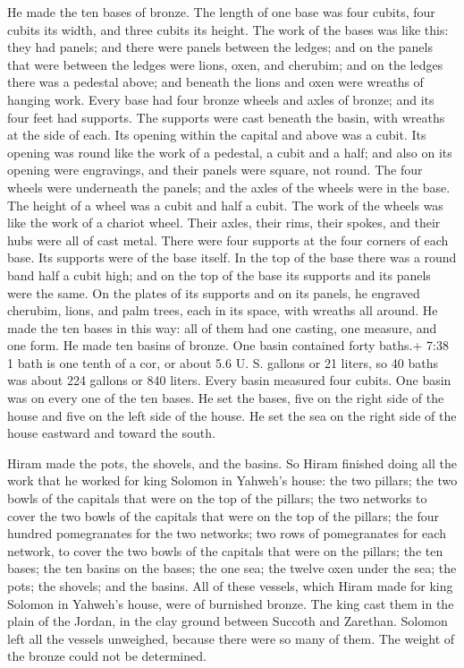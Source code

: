  He made the ten bases of bronze. The length of one base
was four cubits, four cubits its width, and three cubits its height.
 The work of the bases was like this: they had panels; and
there were panels between the ledges;  and on the panels
that were between the ledges were lions, oxen, and cherubim; and on the
ledges there was a pedestal above; and beneath the lions and oxen were
wreaths of hanging work.  Every base had four bronze wheels
and axles of bronze; and its four feet had supports. The supports were
cast beneath the basin, with wreaths at the side of each. 
Its opening within the capital and above was a cubit. Its opening was
round like the work of a pedestal, a cubit and a half; and also on its
opening were engravings, and their panels were square, not round.
 The four wheels were underneath the panels; and the axles
of the wheels were in the base. The height of a wheel was a cubit and
half a cubit.  The work of the wheels was like the work of
a chariot wheel. Their axles, their rims, their spokes, and their hubs
were all of cast metal.  There were four supports at the
four corners of each base. Its supports were of the base itself.
 In the top of the base there was a round band half a cubit
high; and on the top of the base its supports and its panels were the
same.  On the plates of its supports and on its panels, he
engraved cherubim, lions, and palm trees, each in its space, with
wreaths all around.  He made the ten bases in this way: all
of them had one casting, one measure, and one form.  He
made ten basins of bronze. One basin contained forty baths.+ 7:38 1 bath
is one tenth of a cor, or about 5.6 U. S. gallons or 21 liters, so 40
baths was about 224 gallons or 840 liters. Every basin measured four
cubits. One basin was on every one of the ten bases.  He
set the bases, five on the right side of the house and five on the left
side of the house. He set the sea on the right side of the house
eastward and toward the south.

 Hiram made the pots, the shovels, and the basins. So Hiram
finished doing all the work that he worked for king Solomon in Yahweh's
house:  the two pillars; the two bowls of the capitals that
were on the top of the pillars; the two networks to cover the two bowls
of the capitals that were on the top of the pillars;  the
four hundred pomegranates for the two networks; two rows of pomegranates
for each network, to cover the two bowls of the capitals that were on
the pillars;  the ten bases; the ten basins on the bases;
 the one sea; the twelve oxen under the sea; 
the pots; the shovels; and the basins. All of these vessels, which Hiram
made for king Solomon in Yahweh's house, were of burnished bronze.
 The king cast them in the plain of the Jordan, in the clay
ground between Succoth and Zarethan.  Solomon left all the
vessels unweighed, because there were so many of them. The weight of the
bronze could not be determined.

